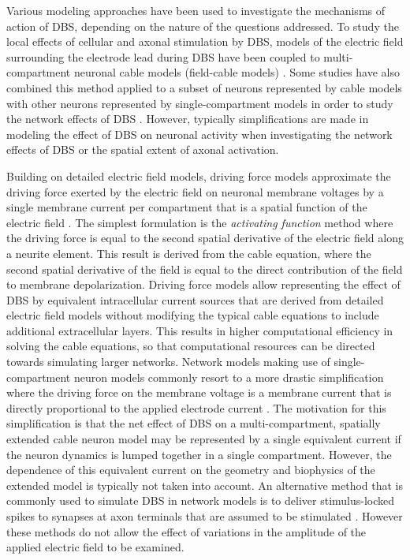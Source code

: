 Various modeling approaches have been used to investigate the mechanisms of action
of DBS, depending on the nature of the questions addressed.
%
To study the local effects of cellular and axonal stimulation by DBS, models of the
electric field surrounding the electrode lead during DBS have been coupled to
multi-compartment neuronal cable models (field-cable models) \cite{mcintyre_cellular_2004,mcintyre_electric_2004,miocinovic_computational_2006,johnson_quantifying_2008,yousif_evaluating_2010,yousif_spatiotemporal_2012,kang_effects_2014,anderson_action_2018}.
Some studies have also combined this method applied to a subset of neurons
represented by cable models with other neurons represented by single-compartment
models in order to study the network effects of DBS \cite{kang_effects_2014,anderson_action_2018}.
%
%
However, typically simplifications are made in modeling the effect of DBS on neuronal
activity when investigating the network effects of DBS or the spatial extent of
axonal activation.

%
Building on detailed electric field models, driving force models approximate the
driving force exerted by the electric field on neuronal membrane voltages by a single
membrane current per compartment that is a spatial function of the electric field \cite{rattay_basic_1999,warman_modeling_1992,peterson_predicting_2011}.
The simplest formulation is the \textit{activating function} method where the
driving force is equal to the second spatial derivative of the electric field
along a neurite element\cite{rattay_basic_1999}. This result is derived
from the cable equation, where the second spatial derivative of the field
is equal to the direct contribution of the field to membrane depolarization.
Driving force models allow representing the effect of DBS by equivalent intracellular current sources
that are derived from detailed electric field models without modifying the
typical cable equations to include additional extracellular layers.
This results in higher computational efficiency in solving the cable equations,
so that computational resources can be directed towards simulating larger networks.
%
%
Network models making use of single-compartment neuron models commonly resort
to a more drastic simplification where the driving force on the membrane voltage
is a membrane current that is directly proportional to the applied electrode
current \cite{feng_optimal_2007,rubin_high_2004,hahn_modeling_2010,pirini_computational_2009,kang_interaction_2013,kumaravelu_biophysical_2016}. The motivation for this simplification
is that the net effect of DBS on a multi-compartment, spatially extended cable
neuron model may be represented by a single equivalent current if the neuron dynamics
is lumped together in a single compartment. However, the dependence of this equivalent
current on the geometry and biophysics of the extended model is typically not
taken into account.
%
An alternative method that is commonly used to simulate DBS in network
models is to deliver stimulus-locked spikes to synapses at axon terminals
that are assumed to be stimulated \cite{hahn_modeling_2010,guo_thalamocortical_2008,mcintyre_cellular_2004,miocinovic_computational_2006}.
However these methods do not allow the effect of variations in the amplitude of the
applied electric field to be examined.

